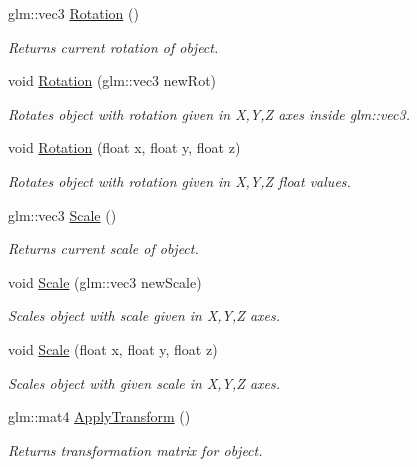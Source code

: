 \begin{DoxyCompactItemize}
glm\+::vec3 \mbox{\hyperlink{class_transform_a4d1718230fdc4dd8f3a0cf810cf223f4}{Rotation}} ()
\begin{DoxyCompactList}\small\item\em Returns current rotation of object. \end{DoxyCompactList}\item 
void \mbox{\hyperlink{class_transform_ae19384ad3a8fc19d997bab8be905eb8a}{Rotation}} (glm\+::vec3 new\+Rot)
\begin{DoxyCompactList}\small\item\em Rotates object with rotation given in X,Y,Z axes inside glm\+::vec3. \end{DoxyCompactList}\item 
void \mbox{\hyperlink{class_transform_a08eb7ce459e2be8c180741f29990583a}{Rotation}} (float x, float y, float z)
\begin{DoxyCompactList}\small\item\em Rotates object with rotation given in X,Y,Z float values. \end{DoxyCompactList}\item 
glm\+::vec3 \mbox{\hyperlink{class_transform_a60238a62017be874dea8514a4b172fcc}{Scale}} ()
\begin{DoxyCompactList}\small\item\em Returns current scale of object. \end{DoxyCompactList}\item 
void \mbox{\hyperlink{class_transform_ab4af0a98c37f0284074e30e3d6d2ca41}{Scale}} (glm\+::vec3 new\+Scale)
\begin{DoxyCompactList}\small\item\em Scales object with scale given in X,Y,Z axes. \end{DoxyCompactList}\item 
void \mbox{\hyperlink{class_transform_a0a30b57dd24261f559604ea64e69e0f9}{Scale}} (float x, float y, float z)
\begin{DoxyCompactList}\small\item\em Scales object with given scale in X,Y,Z axes. \end{DoxyCompactList}\item 
glm\+::mat4 \mbox{\hyperlink{class_transform_a550c9c8417c6d288e6352d6cc424a0e9}{Apply\+Transform}} ()
\begin{DoxyCompactList}\small\item\em Returns transformation matrix for object. \end{DoxyCompactList}\item 

\end{DoxyCompactItemize}
